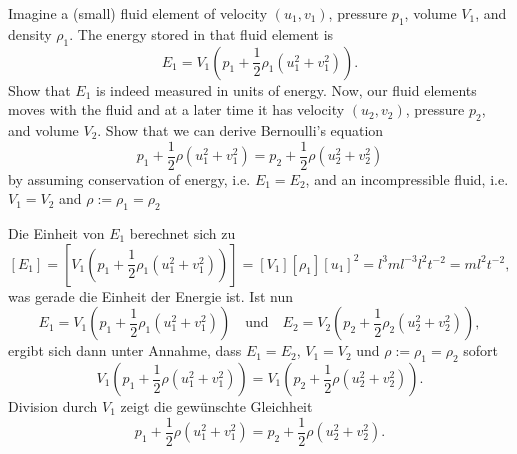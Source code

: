 \documentclass[12pt]{exam}
\begin{document}
\begin{questions}
    
    \question Imagine a (small) fluid element of velocity $(u_1, v_1)$, pressure $p_1$, volume $V_1$, and density $\rho_1$. The energy stored in that fluid element is
    \begin{equation*}
        E_1 = V_1 \left( p_1 + \frac{1}{2} \rho_1 (u^2_1 + v^2_1)\right).
    \end{equation*}
    Show that $E_1$ is indeed measured in units of energy. \newline
    Now, our fluid elements moves with the fluid and at a later time it has velocity $(u_2, v_2)$, pressure $p_2$, and volume $V_2$. Show that we can derive Bernoulli's equation
    \begin{equation*}
        p_1 + \frac{1}{2} \rho (u^2_1 + v^2_1) = p_2 + \frac{1}{2} \rho (u^2_2 + v^2_2)
    \end{equation*}
    by assuming conservation of energy, i.e. $E_1 = E_2$, and an incompressible fluid, i.e. $V_1 = V_2$ and $\rho := \rho_1 = \rho_2$
    
    \begin{solution}
        Die Einheit von $E_1$ berechnet sich zu
        \begin{equation*}
            \left[E_1\right]=\left[V_1 \left( p_1 + \frac{1}{2} \rho_1 (u^2_1 + v^2_1)\right)\right]=
            \left[ V_1\right]\left[\rho_1 \right]\left[u_1 \right]^2=
            l^3ml^{-3}l^2t^{-2}=ml^2t^{-2},
        \end{equation*}
        was gerade die Einheit der Energie ist. Ist nun
        \begin{equation*}
            E_1 = V_1 \left( p_1 + \frac{1}{2} \rho_1 (u^2_1 + v^2_1)\right)
            \quad \text{und} \quad
            E_2 = V_2 \left( p_2 + \frac{1}{2} \rho_2 (u^2_2 + v^2_2)\right),
        \end{equation*}
        ergibt sich dann unter Annahme, dass $E_1 = E_2$, $V_1 = V_2$ und $\rho := \rho_1 = \rho_2$ sofort
        \begin{equation*}
            V_1 \left( p_1 + \frac{1}{2} \rho (u^2_1 + v^2_1)\right) = V_1 \left( p_2 + \frac{1}{2} \rho (u^2_2 + v^2_2)\right).
        \end{equation*}
        Division durch $V_1$ zeigt die gewünschte Gleichheit
        \begin{equation*}
            p_1 + \frac{1}{2} \rho (u^2_1 + v^2_1) = p_2 + \frac{1}{2} \rho (u^2_2 + v^2_2).
        \end{equation*}
    \end{solution}
    

\end{questions}
\end{document}
